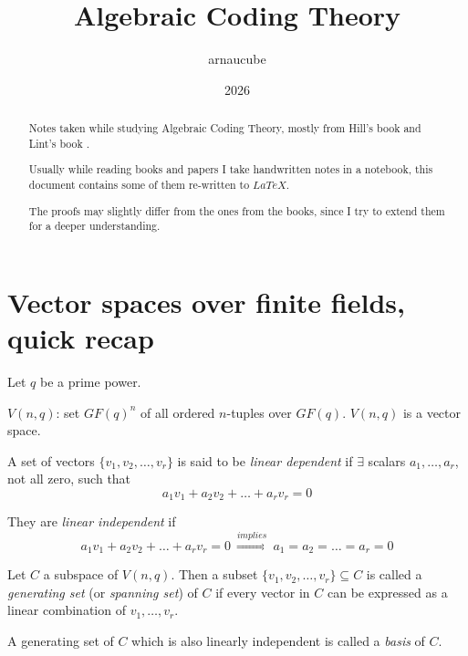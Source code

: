 \documentclass{article}
\title{Algebraic Coding Theory}
\author{arnaucube}
\date{2026}
\theoremstyle{definition}
\newcommand{\Vnq}{V(n, q)}
\begin{document}
\maketitle

\begin{abstract}
    Notes taken while studying Algebraic Coding Theory, mostly from Hill's book \cite{hill} and Lint's book \cite{lint}.

    Usually while reading books and papers I take handwritten notes in a notebook, this document contains some of them re-written to $LaTeX$.

    The proofs may slightly differ from the ones from the books, since I try to extend them for a deeper understanding.
\end{abstract}

\tableofcontents


\section{Vector spaces over finite fields, quick recap}
Let $q$ be a prime power. 

$\Vnq$: set $GF(q)^n$ of all ordered $n$-tuples over $GF(q)$. $\Vnq$ is a
vector space.

A set of vectors $\{v_1, v_2, \ldots, v_r \}$ is said to be \emph{linear dependent} if $\exists$ scalars $a_1, \ldots, a_r$, not all zero, such that
$$a_1 v_1 + a_2 v_2 + \ldots + a_r v_r = 0$$

They are \emph{linear independent} if
$$a_1 v_1 + a_2 v_2 + \ldots + a_r v_r = 0 ~\stackrel{implies}{\Longrightarrow}~ a_1=a_2=\ldots=a_r=0$$

Let $C$ a subspace of $\Vnq$. Then a subset $\{v_1, v_2, \ldots, v_r \} \subseteq C$ is called a \emph{generating set} (or \emph{spanning set}) of $C$ if every vector in $C$ can be expressed as a linear combination of $v_1, \ldots, v_r$.

A generating set of $C$ which is also linearly independent is called a \emph{basis} of $C$.
\end{document}
